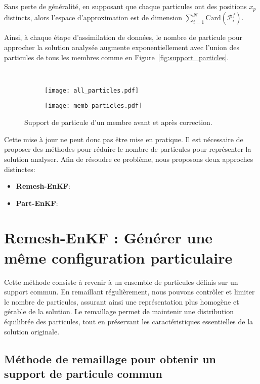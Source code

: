 Sans perte de généralité, en supposant que chaque particules ont des positions $x_p$ distincts, alors l'espace d'approximation est de dimension $\sum_{i=1}^{N} \text{Card}(\mathcal{P}^f_i)$.

Ainsi, à chaque étape d'assimilation de données, le nombre de particule pour approcher la solution analysée augmente exponentiellement avec l'union des particules de tous les membres comme en Figure~\ref{fig:support_particles}.

\begin{figure}~\label{fig:support_particles}
    \centering
    \begin{subfigure}{0.5\textwidth}
        \texttt{[image: all\_particles.pdf]}
    \end{subfigure}
    \begin{subfigure}{0.5\textwidth}
        \texttt{[image: memb\_particles.pdf]}
    \end{subfigure}
    \caption{Support de particule d'un membre avant et après correction.}
\end{figure}

Cette mise à jour ne peut donc pas être mise en pratique. Il est nécessaire de proposer des méthodes pour réduire le nombre de particules pour représenter la solution analyser. Afin de résoudre ce problème, nous proposons deux approches distinctes:

\begin{itemize}
    \item \textbf{Remesh-EnKF}: \\
    \item \textbf{Part-EnKF}: \\
\end{itemize}

\section{Remesh-EnKF : Générer une même configuration particulaire}

Cette méthode consiste à revenir à un ensemble de particules définis sur un support commun. En remaillant régulièrement, nous pouvons contrôler et limiter le nombre de particules, assurant ainsi une représentation plus homogène et gérable de la solution. Le remaillage permet de maintenir une distribution équilibrée des particules, tout en préservant les caractéristiques essentielles de la solution originale.

\subsection*{Méthode de remaillage pour obtenir un support de particule commun}~\label{sec:remesh}

